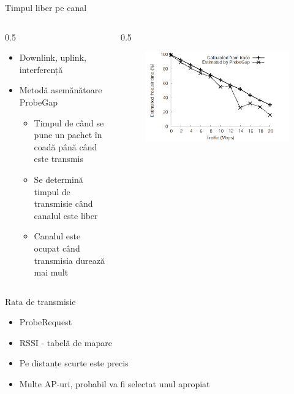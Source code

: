 \begin{frame}{Timpul liber pe canal}
  \begin {columns}
  \begin {column}{0.5\linewidth}
  \begin{itemize}
    \item Downlink, uplink, interferență
    \item Metodă asemănătoare ProbeGap
    \begin{itemize}
      \item Timpul de când se pune un pachet în coadă până când este transmis
      \item Se determină timpul de transmisie când canalul este liber
      \item Canalul este ocupat când transmisia durează mai mult
    \end{itemize}
  \end{itemize}
  \end{column}
  \begin {column}{0.5\linewidth}
      \begin{figure}
        \includegraphics[scale=0.20]{img/fig4.png}
      \end{figure}
  \end{column}
  \end{columns}
\end{frame}
  
\begin{frame}{Rata de transmisie}
  \begin{itemize}
    \item ProbeRequest
    \item RSSI - tabelă de mapare
    \item Pe distanțe scurte este precis
    \item Multe AP-uri, probabil va fi selectat unul apropiat
  \end{itemize}
\end{frame}
